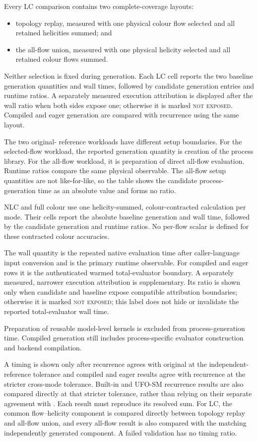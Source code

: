 Every LC comparison contains two complete-coverage layouts:
\begin{itemize}
  \item topology replay, measured with one physical colour flow selected and
        all retained helicities summed; and
  \item the all-flow union, measured with one physical helicity selected and
        all retained colour flows summed.
\end{itemize}
Neither selection is fixed during generation. Each LC cell reports the two
baseline generation quantities and wall times, followed by candidate
generation entries and runtime ratios. A separately measured execution
attribution is displayed after the wall ratio when both sides expose one;
otherwise it is marked \textsc{not exposed}. Compiled and eager generation are
compared with recurrence using the same layout.

The two original-\AC{} reference workloads have different setup boundaries.
For the selected-flow workload, the reported generation quantity is creation
of the process library. For the all-flow workload, it is preparation of direct
all-flow evaluation. Runtime ratios compare the same physical observable. The
all-flow setup quantities are not like-for-like, so the table shows the
candidate process-generation time as an absolute value and forms no ratio.

NLC and full colour use one helicity-summed, colour-contracted calculation per
mode. Their cells report the absolute baseline generation and wall time,
followed by the candidate generation and runtime ratios. No per-flow scalar is
defined for these contracted colour accuracies.

The wall quantity is the repeated native evaluation time after caller-language
input conversion and is the primary runtime observable. For compiled and eager
rows it is the authenticated warmed total-evaluator boundary. A separately
measured, narrower execution attribution is supplementary. Its ratio is shown
only when candidate and baseline expose compatible attribution boundaries;
otherwise it is marked \textsc{not exposed}; this label does not hide or
invalidate the reported total-evaluator wall time.

Preparation of reusable model-level kernels is excluded from
process-generation time. Compiled generation still includes process-specific
evaluator construction and backend compilation.

A timing is shown only after recurrence agrees with original \AC{} at the
independent-reference tolerance and compiled and eager results agree with
recurrence at the stricter cross-mode tolerance. Built-in and UFO-SM recurrence
results are also compared directly at that stricter tolerance, rather than
relying on their separate agreement with \AC{}. Each result must reproduce its
resolved sum. For LC, the common flow--helicity component is compared directly
between topology replay and all-flow union, and every \PAC{} all-flow result is
also compared with the matching independently generated \AC{} component. A
failed validation has no timing ratio.

